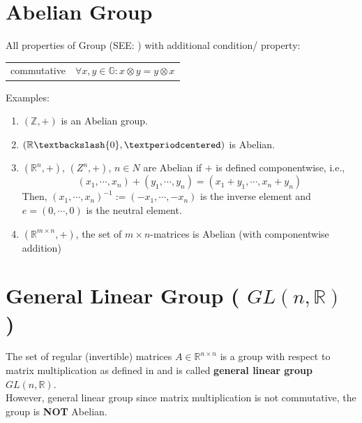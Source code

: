 \section{Abelian Group \cite{mfml-1}}\label{Abelian Group}

All properties of Group (SEE: ) with additional condition/ property:

\begin{table}[H]
    \begin{tabular}{l l}
        commutative \hspace{0.5cm} & $\forall x,y \in \mathbb{G}:x\otimes y = y\otimes x$ \\
    \end{tabular}
\end{table}

Examples:
\begin{enumerate}[itemsep=0.2cm]
    \item $(\mathbb{Z}, +)$ is an Abelian group.
    \item $(\mathbb{R}\textbackslash {0}, ·)$ is Abelian.
    \item $(\mathbb{R}^n, +)$, $(Z^n, +)$, $n \in N$ are Abelian if $+$ is defined componentwise, i.e., 
    \[
        (x_1, \cdots , x_n) + (y_1, \cdots , y_n) = (x_1 + y_1, \cdots , x_n + y_n)
    \]
    Then, $(x_1, \cdots , x_n)^{-1} := (-x_1, \cdots , -x_n)$ is the inverse element and $e = (0, \cdots , 0)$ is the neutral element.
    \item $(\mathbb{R}^{m\times n}, +)$, the set of $m \times n$-matrices is Abelian (with componentwise addition)
\end{enumerate}










\section{General Linear Group ( $GL(n,\mathbb{R})$ ) \cite{mfml-1}}\label{General Linear Group}

The set of regular (invertible) matrices $A \in \mathbb{R}^{n \times n}$ is a group with respect to matrix multiplication as defined in and is called \textbf{general linear group} $GL(n, \mathbb{R})$.\\
However, general linear group since matrix multiplication is not commutative, the group is \textbf{NOT} Abelian.


